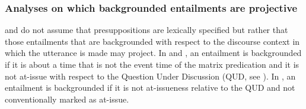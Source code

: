 \documentclass[a4paper,12pt,twoside]{article}
\begin{document}
	

	\subsubsection{Analyses on which backgrounded entailments are projective} 
 
		\citealt{abrusan_predicting_2011,abrusan_presupposition_2016} and \citealt{simons_best_2017} do not assume that presuppositions are lexically specified but rather that those entailments that are backgrounded with respect to the discourse context in which the utterance is made may project. %
		In \citealt{abrusan_predicting_2011} and \citealt{abrusan_presupposition_2016}, an entailment is backgrounded if it is about a time that is not the event time of the matrix predication and it is not at-issue with respect to the Question Under Discussion (QUD, see \citealt{roberts_information_1996,roberts_information_2012}). In \citealt{simons_best_2017}, an entailment is backgrounded if it is not at-issueness relative to the QUD and not conventionally marked as at-issue.

\end{document}
